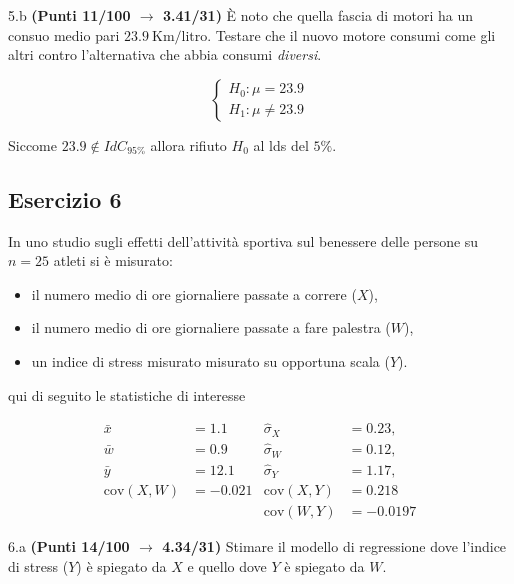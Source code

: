 \documentclass[
  11pt,
]{book}
\providecommand{\tightlist}{%
  \setlength{\itemsep}{0pt}\setlength{\parskip}{0pt}}
\theoremstyle{mytheoremstyle}
\theoremstyle{mydefstyle}
\newenvironment{sol}
  {
  \begin{tcolorbox}[enhanced,breakable,arc=0.1mm,boxrule=1pt,colback=white,colframe=iblue,
  title=\bf \fontfamily{lmss}\selectfont \hspace{.5 cm} Soluzione,drop fuzzy shadow]

}{
\end{tcolorbox}
  }
\begin{document}
5.b \textbf{(Punti 11/100 \(\rightarrow\) 3.41/31)} È noto che quella fascia di motori ha un consuo medio pari \(23.9~\text{Km/litro}\). Testare che il nuovo motore consumi come gli altri contro l'alternativa che abbia consumi \emph{diversi}.

\begin{sol}
\[
\begin{cases}
H_0:\mu=23.9\\
H_1:\mu\ne23.9
\end{cases}
\]

Siccome \(23.9\notin IdC_{95\%}\) allora rifiuto \(H_0\) al lds del \(5\%\).

\end{sol}

\subsection{Esercizio 6}\label{esercizio-6-6}

In uno studio sugli effetti dell'attività sportiva sul benessere delle persone su \(n=25\) atleti si è misurato:

\begin{itemize}
\tightlist
\item
  il numero medio di ore giornaliere passate a correre (\(X\)),
\item
  il numero medio di ore giornaliere passate a fare palestra (\(W\)),
\item
  un indice di stress misurato misurato su opportuna scala (\(Y\)).
\end{itemize}

qui di seguito le statistiche di interesse

\begin{align*}
\bar x&=1.1   &\hat \sigma_X&=0.23, \\
\bar w&=0.9   &\hat \sigma_W&=0.12,\\
\bar y&=12.1  &\hat \sigma_Y&=1.17,\\
\text{cov}(X,W)&=-0.021 &\text{cov}(X,Y)&=0.218 \\
&&\text{cov}(W,Y)&=-0.0197
\end{align*}

6.a \textbf{(Punti 14/100 \(\rightarrow\) 4.34/31)} Stimare il modello di regressione dove l'indice di stress (\(Y\)) è spiegato da \(X\) e quello dove \(Y\) è spiegato da \(W\).
\end{document}
